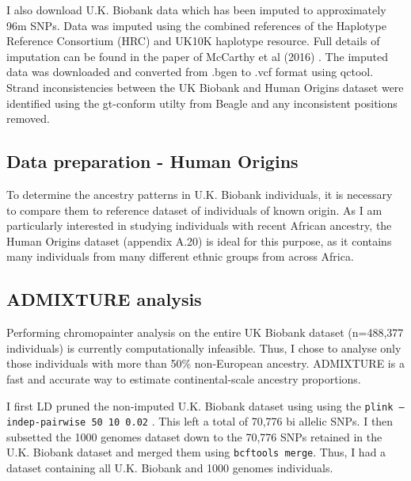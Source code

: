 I also download U.K. Biobank data which has been imputed to approximately 96m SNPs. Data was imputed using the combined references of the Haplotype Reference Consortium (HRC) and UK10K haplotype resource. Full details of imputation can be found in the paper of McCarthy et al (2016) \cite{mccarthy2016reference}. The imputed data was downloaded and converted from .bgen to .vcf format using qctool. Strand inconsistencies between the UK Biobank and Human Origins dataset were identified using the gt-conform utilty from Beagle and any inconsistent positions removed.

\subsection{Data preparation - Human Origins}

To determine the ancestry patterns in U.K. Biobank individuals, it is necessary to compare them to reference dataset of individuals of known origin. As I am particularly interested in studying individuals with recent African ancestry, the Human Origins dataset (appendix A.20) is ideal for this purpose, as it contains many individuals from many different ethnic groups from across Africa. 


\subsection{ADMIXTURE analysis}

Performing chromopainter analysis on the entire UK Biobank dataset (n=488,377 individuals) is currently computationally infeasible. Thus, I chose to analyse only those individuals with more than 50\% non-European ancestry. ADMIXTURE is a fast and accurate way to estimate continental-scale ancestry proportions.

I first LD pruned the non-imputed U.K. Biobank dataset using using the \texttt{plink --indep-pairwise 50 10 0.02} \cite{purcell2007plink}. This left a total of  70,776 bi allelic SNPs. I then subsetted the 1000 genomes dataset down to the 70,776 SNPs retained in the U.K. Biobank dataset and merged them using \texttt{bcftools merge}. Thus, I had a dataset containing all U.K. Biobank and 1000 genomes individuals. 

